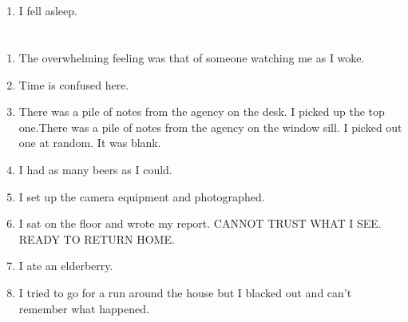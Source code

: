 \documentclass{article}
\begin{document}
    \newpage
    
    \section{}
    
    \begin{enumerate}
    
    \item I fell asleep.\\
    
    \end{enumerate}
     
    \newpage
    
    \section{}
    
    \begin{enumerate}
    
    \item The overwhelming feeling was that of someone watching me as I woke.\\
    
    \item Time is confused here.\\
    
    \item There was a pile of notes from the agency on the desk. I picked up the top one.There was a pile of notes from the agency on the window sill. I picked out one at random. It was blank.\\
    
    \item I had as many beers as I could.\\
    
    \item I set up the camera equipment and photographed.\\
    
    \item I sat on the floor and wrote my report. CANNOT TRUST WHAT I SEE. READY TO RETURN HOME.\\
    
    \item I ate an elderberry.\\
    
    \item I tried to go for a run around the house but I blacked out and can't remember what happened.\\
    
    \end{enumerate}
     
\end{document}
